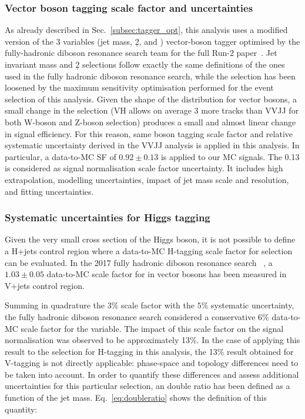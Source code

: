\subsubsection{Vector boson tagging scale factor and uncertainties}
\label{sec:syst-vec-boson}
As already described in Sec.~\ref{subsec:tagger_opt}, this analysis uses a modified version of the 3 variables (jet mass, \d2, and \ntrk) vector-boson tagger optimised by the fully-hadronic diboson resonance search team for the full Run-2 paper~\cite{VVJJPaper2019}. Jet invariant mass and \d2 selections follow exactly the same definitions of the ones used in the fully hadronic diboson resonance search, while the \ntrk selection has been loosened by the maximum sensitivity optimisation performed for the event selection of this analysis.
Given the shape of the \ntrk distribution for vector bosons, a small change in the \ntrk selection (VH allows on average 3 more tracks than VVJJ for both W-boson and Z-boson selection) produces a small and almost linear change in signal efficiency.
For this reason, same boson tagging scale factor and relative systematic uncertainty derived in the VVJJ analysis is applied in this analysis.
In particular, a data-to-MC SF of $0.92\pm0.13$ is applied to our MC signals. The 0.13 is considered as signal normalisation scale factor uncertainty. It includes high \pt~ extrapolation, modelling uncertainties, impact of jet mass scale and resolution, and fitting uncertainties.

\subsubsection{Systematic uncertainties for Higgs tagging}
\label{sec:syst-h-boson}
Given the very small cross section of the Higgs boson, it is not possible to define a H+jets control region where a data-to-MC H-tagging scale factor for \ntrk selection can be evaluated.
In the 2017 fully hadronic diboson resonance search ~\cite{VVJJPaper2017}, a $1.03\pm0.05$ data-to-MC scale factor for \ntrk in vector bosons has been measured in V+jets control region.

Summing in quadrature the $3\%$ scale factor with the $5\%$ systematic uncertainty, the fully hadronic diboson resonance search considered a conservative 6\% data-to-MC scale factor for the \ntrk variable.
The impact of this scale factor on the signal normalisation was observed to be approximately 13\%.
In the case of applying this result to the \ntrk selection for H-tagging in this analysis, the 13\% result obtained for V-tagging is not directly applicable: phase-space and topology differences need to be taken into account.
In order to quantify these differences and assess additional uncertainties for this particular selection, an \ntrk double ratio has been defined as a function of the jet mass.
Eq.~\ref{eq:doubleratio} shows the definition of this quantity:

